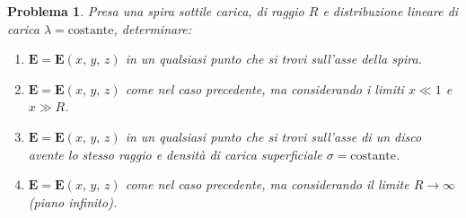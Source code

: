\documentclass[a4paper,oneside]{article}
\newtheorem{problema}{Problema}
\renewcommand{\vec}[1]{\mathbf{#1}}
\begin{document}
\begin{problema}
	Presa una spira sottile carica, di raggio $R$ e 
	distribuzione lineare di carica $\lambda = \mathrm{costante}$, 
	determinare:
	\begin{enumerate}
		\item $\vec{E} = \vec{E}(x,\,y,\,z)$ in un qualsiasi punto 
		che si trovi sull'asse della spira.
		\item $\vec{E} = \vec{E}(x,\,y,\,z)$ come nel caso precedente,
		ma considerando i limiti $x \ll 1$ e $x \gg R$.
		\item $\vec{E} = \vec{E}(x,\,y,\,z)$ in un qualsiasi punto 
		che si trovi sull'asse di un disco avente lo stesso raggio
		e densità di carica superficiale $\sigma = \mathrm{costante}$.
		\item $\vec{E} = \vec{E}(x,\,y,\,z)$ come nel caso precedente,
		ma considerando il limite $R \longrightarrow \infty$ (piano infinito).
	\end{enumerate}
\end{problema}
\end{document}
